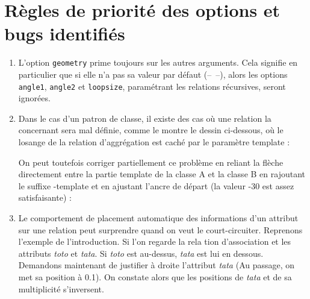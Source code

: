 \documentclass[a4paper,11pt]{report}
\newcommand{\inputTikZ}[1]{%
  }%
\newcommand{\inputTikZ}[1]{%
    \texttt{[image: fig/\#1.pdf]}%
  }%
\begin{document}
\section{Règles de priorité des options et bugs identifiés}\label{s.classbug}

\begin{enumerate}
\item L'option {\tt geometry} prime toujours sur les autres arguments. Cela signifie en particulier que si elle n'a pas sa valeur par défaut (--~--), alors les options {\tt angle1}, {\tt angle2} et {\tt loopsize}, paramétrant les relations récursives, seront ignorées.
\item Dans le cas d'un patron de classe, il existe des cas où une relation la concernant sera mal définie, comme le montre le dessin ci-dessous, où le losange de la relation d'aggrégation est caché par le paramètre template :

\begin{minipage}{0.6\textwidth}

\end{minipage}
\begin{minipage}{0.4\textwidth}
\begin{center}
\inputTikZ{figure38}
\end{center}
\end{minipage}

\medskip

On peut toutefois corriger partiellement ce problème en reliant la flèche directement entre la partie template de la classe A et la classe B en rajoutant le suffixe -template et en ajustant l'ancre de départ (la valeur -30 est assez satisfaisante) : 

\medskip

\begin{minipage}{0.6\textwidth}

\end{minipage}
\begin{minipage}{0.4\textwidth}
\begin{center}
\inputTikZ{figure39}
\end{center}
\end{minipage}

\medskip

\item Le comportement de placement automatique des informations d'un attribut sur une relation peut surprendre quand on veut le court-circuiter. Reprenons l'exemple de l'introduction. Si l'on regarde la rela	tion d'association et les attributs {\it toto} et {\it tata}. Si {\it toto} est au-dessus, {\it tata} est lui en dessous. Demandons maintenant de justifier à droite l'attribut {\it tata} (Au passage, on met sa position à 0.1). On constate alors que les positions de {\it tata} et de sa multiplicité s'inversent.

\begin{center}
\inputTikZ{figure40}
\end{center}

\end{enumerate}
\end{document}
